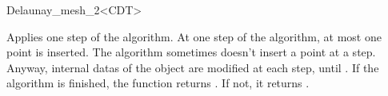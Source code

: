 \begin{ccRefClass}{Delaunay_mesh_2<CDT>}
\begin{ccAdvanced}
         { Applies one step of the algorithm. At one step of the algorithm,
           at most one point is inserted. The algorithm
           sometimes doesn't insert a point at a step. Anyway,
           internal datas of the \ccRefName{} object are modified at
           each step, until . If the algorithm
           is finished, the function returns . If not, it 
           returns .}

\end{ccAdvanced}

\end{ccRefClass}

